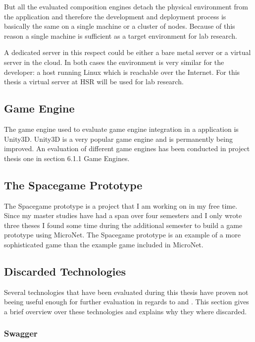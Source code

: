 But all the evaluated composition engines detach the physical environment from
the application and therefore the development and deployment process is basically
the same on a single machine or a cluster of nodes. Because of this reason a
single machine is sufficient as a target environment for lab research.

A dedicated server in this respect could be either a bare metal server or a
virtual server in the cloud. In both cases the environment is very similar for
the developer: a host running Linux which is reachable over the Internet. For
this thesis a virtual server at HSR will be used for lab research.

\subsection{Game Engine}

The game engine used to evaluate game engine integration in a \ms{} application
is Unity3D. Unity3D is a very popular game engine and is permanently being
improved. An evaluation of different game engines has been conducted in project
thesis one \cite{biedermann2015project1} in section 6.1.1 Game Engines.

\subsection{The Spacegame Prototype}

The Spacegame prototype is a project that I am working on in my free time. Since
my master studies have had a span over four semesters and I only wrote three
theses I found some time during the additional semester to build a game prototype using
MicroNet. The Spacegame prototype is an example of a more sophisticated game
than the example game included in MicroNet.

\subsection{Discarded Technologies}

Several technologies that have been evaluated during this thesis have proven
not beeing useful enough for further evaluation in regards to \ogs{} and \mss{}.
This section gives a brief overview over these technologies and explains why
they where discarded.

\subsubsection{Swagger}

